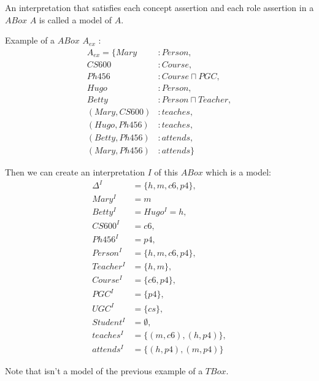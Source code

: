 \documentclass[a4paper,11pt]{report}
\begin{document}
An interpretation that satisfies each concept assertion and each role assertion in a $ABox$ $A$ is called a model of $A$.

Example of a $ABox$ $A_{ex}$ :
\begin{align*}
A_{ex} = \{ Mary &: Person, \\
CS600 &: Course,\\
Ph456 &: Course \sqcap PGC,\\
Hugo &: Person,\\
Betty &: Person \sqcap Teacher,\\
(Mary,CS600) &: teaches,\\
(Hugo,Ph456) &: teaches,\\
(Betty,Ph456) &: attends,\\
(Mary,Ph456) &: attends \}
\end{align*}

Then we can create an interpretation $I$ of this $ABox$ which is a model:
\begin{align*}
\Delta^I &= \{h,m,c6,p4\}, \\
Mary^I &= m \\
Betty^I &= Hugo^I = h, \\
CS600^I &=  c6,\\
Ph456^I &=  p4,\\
Person^I &= \{h,m,c6,p4\},\\
Teacher^I &= \{h,m\},\\
Course^I &= \{c6,p4\},\\
PGC^I &= \{p4\},\\
UGC^I &= \{cs\},\\
Student^I &= \emptyset,\\
teaches^I &= \{(m,c6),(h,p4)\},\\
attends^I &= \{(h,p4),(m,p4)\}
\end{align*}

Note that isn't a model of the previous example of a $TBox$.
\end{document}

